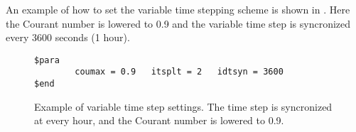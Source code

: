 An example of how to set the variable time stepping scheme is shown
in \Fig{}. Here the Courant number is lowered to 0.9 and
the variable time step is syncronized every 3600 seconds (1 hour).

\begin{figure}[ht]
\begin{verbatim}
$para
        coumax = 0.9   itsplt = 2   idtsyn = 3600
$end
\end{verbatim}
\caption{Example of variable time step settings. The time step is syncronized
at every hour, and the Courant number is lowered to 0.9.}
\label{fig:vartime}
\end{figure}

